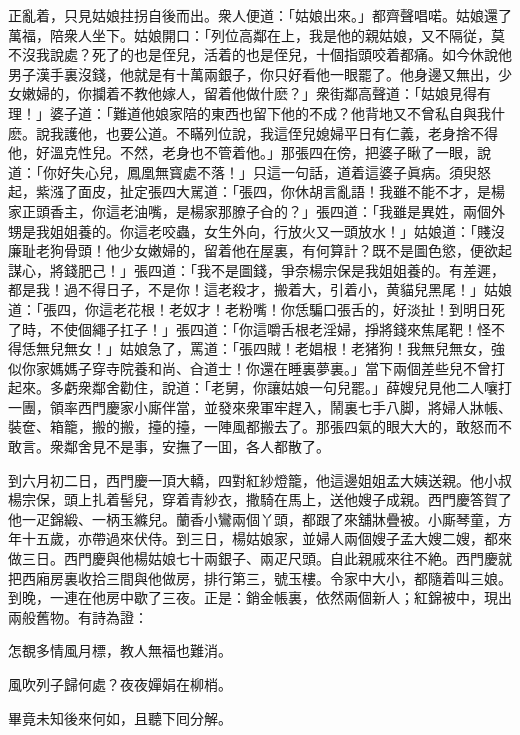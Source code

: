正亂着，只見姑娘拄拐自後而出。衆人便道：「姑娘出來。」都齊聲唱喏。姑娘還了萬福，陪衆人坐下。姑娘開口：「列位高鄰在上，我是他的親姑娘，又不隔従，莫不沒我說處？死了的也是侄兒，活着的也是侄兒，十個指頭咬着都痛。如今休說他男子漢手裏沒錢，他就是有十萬兩銀子，你只好看他一眼罷了。他身邊又無出，少女嫩婦的，你攔着不教他嫁人，留着他做什麽？」衆街鄰高聲道：「姑娘見得有理！」婆子道：「難道他娘家陪的東西也留下他的不成？他背地又不曾私自與我什麽。說我護他，也要公道。不瞞列位說，我這侄兒媳婦平日有仁義，老身捨不得他，好溫克性兒。不然，老身也不管着他。」那張四在傍，把婆子瞅了一眼，說道：「你好失心兒，鳳凰無寳處不落！」只這一句話，道着這婆子眞病。須臾怒起，紫漒了面皮，扯定張四大駡道：「張四，你休胡言亂語！我雖不能不才，是楊家正頭香主，你這老油嘴，是楊家那膫子㒲的？」張四道：「我雖是異姓，兩個外甥是我姐姐養的。你這老咬蟲，女生外向，行放火又一頭放水！」姑娘道：「賤沒廉耻老狗骨頭！他少女嫩婦的，留着他在屋裏，有何算計？既不是圖色慾，便欲起謀心，將錢肥己！」張四道：「我不是圖錢，爭奈楊宗保是我姐姐養的。有差遲，都是我！過不得日子，不是你！這老殺才，搬着大，引着小，黄貓兒黑尾！」姑娘道：「張四，你這老花根！老奴才！老粉嘴！你恁騙口張舌的，好淡扯！到明日死了時，不使個繩子扛子！」張四道：「你這嚼舌根老淫婦，掙將錢來焦尾靶！怪不得恁無兒無女！」姑娘急了，罵道：「張四賊！老娼根！老猪狗！我無兒無女，強似你家媽媽子穿寺院養和尚、㒲道士！你還在睡裏夢裏。」當下兩個差些兒不曾打起來。多虧衆鄰舍勸住，說道：「老舅，你讓姑娘一句兒罷。」薛嫂兒見他二人嚷打一團，領率西門慶家小廝伴當，並發來衆軍牢趕入，鬧裏七手八脚，將婦人牀帳、裝奩、箱籠，搬的搬，擡的擡，一陣風都搬去了。那張四氣的眼大大的，敢怒而不敢言。衆鄰舍見不是事，安撫了一囬，各人都散了。

到六月初二日，西門慶一頂大轎，四對紅紗燈籠，他這邊姐姐孟大姨送親。他小叔楊宗保，頭上扎着髻兒，穿着青紗衣，撒騎在馬上，送他嫂子成親。西門慶答賀了他一疋錦緞、一柄玉縧兒。蘭香小鸞兩個丫頭，都跟了來舖牀疊被。小廝琴童，方年十五歲，亦帶過來伏侍。到三日，楊姑娘家，並婦人兩個嫂子孟大嫂二嫂，都來做三日。西門慶與他楊姑娘七十兩銀子、兩疋尺頭。自此親戚來往不絶。西門慶就把西廂房裏收拾三間與他做房，排行第三，號玉樓。令家中大小，都隨着叫三娘。到晚，一連在他房中歇了三夜。正是：銷金帳裏，依然兩個新人；紅錦被中，現出兩般舊物。有詩為證：
\begin{myquote}
怎覩多情風月標，教人無福也難消。

風吹列子歸何處？夜夜嬋娟在柳梢。
\end{myquote}

畢竟未知後來何如，且聽下囘分解。

